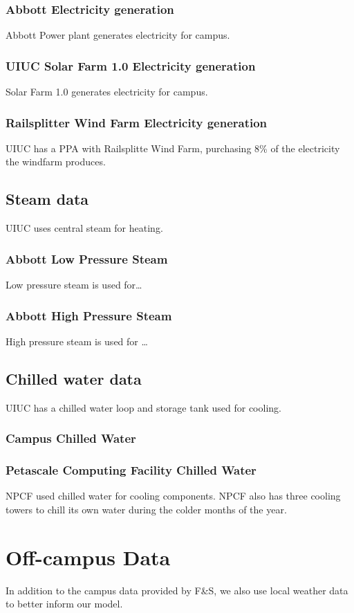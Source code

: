 		\subsubsection{Abbott Electricity generation}
			Abbott Power plant generates electricity for campus.
		\subsubsection{UIUC Solar Farm 1.0 Electricity generation}
			Solar Farm 1.0 generates electricity for campus.
	
		\subsubsection{Railsplitter Wind Farm Electricity generation}
			UIUC has a PPA with Railsplitte Wind Farm, purchasing 8\% of the electricity the windfarm produces.
	
	\subsection{Steam data}
		UIUC uses central steam for heating.
		\subsubsection{Abbott Low Pressure Steam}
			Low pressure steam is used for\ldots
		\subsubsection{Abbott High Pressure Steam}
			High pressure steam is used for \ldots

	\subsection{Chilled water data}
		UIUC has a chilled water loop and storage tank used for cooling.
		\subsubsection{Campus Chilled Water}
			
		\subsubsection{Petascale Computing Facility Chilled Water}
			NPCF used chilled water for cooling components. NPCF also has three cooling towers to chill its own water during the colder months of the year.
\section{Off-campus Data}
	In addition to the campus data provided by F\&S, we also use local weather data to better inform our model.
